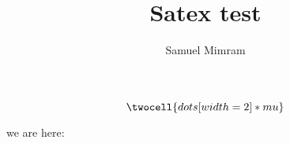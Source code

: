 \documentclass[a4paper]{article}
\title{Satex test}
\author{Samuel Mimram}
\begin{document}
\maketitle

\[
  \twocell{dots[width=2] * mu}
\]











we are here:













\end{document}
